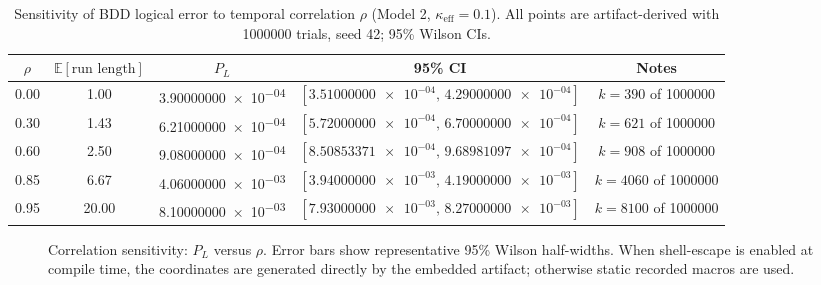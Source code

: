 \documentclass{article}
\newcommand{\simtrials}{1000000}
\newcommand{\simseed}{42}
\newcommand{\simrhoB}{0.60}
\newcommand{\simpLB}{9.08000000e-04}
\newcommand{\simpLBlo}{8.50853371e-04}
\newcommand{\simpLBhi}{9.68981097e-04}
\newcommand{\simkB}{908}
\newcommand{\simrhoD}{0.00}
\newcommand{\simpLD}{3.90000000e-04}
\newcommand{\simpLDlo}{3.51000000e-04}
\newcommand{\simpLDhi}{4.29000000e-04}
\newcommand{\simkD}{390}
\newcommand{\simrhoA}{0.30}
\newcommand{\simpLA}{6.21000000e-04}
\newcommand{\simpLAlo}{5.72000000e-04}
\newcommand{\simpLAhi}{6.70000000e-04}
\newcommand{\simkA}{621}
\newcommand{\simrhoC}{0.85}
\newcommand{\simpLC}{4.06000000e-03}
\newcommand{\simpLClo}{3.94000000e-03}
\newcommand{\simpLChi}{4.19000000e-03}
\newcommand{\simkC}{4060}
\newcommand{\simrhoE}{0.95}
\newcommand{\simpLE}{8.10000000e-03}
\newcommand{\simpLElo}{7.93000000e-03}
\newcommand{\simpLEhi}{8.27000000e-03}
\newcommand{\simkE}{8100}
\newcommand{\eLDhi}{3.90000000e-05}
\newcommand{\eLAhi}{4.90000000e-05}
\newcommand{\eLBhi}{6.10000000e-05}
\newcommand{\eLChi}{1.30000000e-04}
\newcommand{\eLEhi}{1.70000000e-04}
\newcommand{\rhoPlotCoords}{
  (\simrhoD,\simpLD) +- (0,\eLDhi)
  (\simrhoA,\simpLA) +- (0,\eLAhi)
  (\simrhoB,\simpLB) +- (0,\eLBhi)
  (\simrhoC,\simpLC) +- (0,\eLChi)
  (\simrhoE,\simpLE) +- (0,\eLEhi)
}
\newif\ifartifactplots
\newcommand{\RhoPlotAdd}{%
  \ifartifactplots
    \addplot+[only marks,mark=o,mark size=2pt, error bars/.cd, y dir=both, y explicit]
  \else
    \addplot+[only marks,mark=o,mark size=2pt, error bars/.cd, y dir=both, y explicit]
      coordinates {
        \rhoPlotCoords
      };
  \fi
}
\begin{document}
\begin{table}[ht]
\small
\centering
\caption{Sensitivity of BDD logical error to temporal correlation \(\rho\) (Model 2, \(\kappa_{\mathrm{eff}}=0.1\)). All points are artifact-derived with \simtrials{} trials, seed \simseed; 95\% Wilson CIs.}
\label{tab:sensitivity}
\begin{adjustbox}{width=\linewidth}
\begin{tabular}{ccccc}
\toprule
\(\rho\) & \(\mathbb{E}[\text{run length}]\) & \(P_L\) & 95\% CI & Notes \\
\midrule
\simrhoD & 1.00 & \num{\simpLD} & \([\num{\simpLDlo},\,\num{\simpLDhi}]\) & \(k=\simkD\) of \simtrials \\
\simrhoA & 1.43 & \num{\simpLA} & \([\num{\simpLAlo},\,\num{\simpLAhi}]\) & \(k=\simkA\) of \simtrials \\
\simrhoB & 2.50 & \num{\simpLB} & \([\num{\simpLBlo},\,\num{\simpLBhi}]\) & \(k=\simkB\) of \simtrials \\
\simrhoC & 6.67 & \num{\simpLC} & \([\num{\simpLClo},\,\num{\simpLChi}]\) & \(k=\simkC\) of \simtrials \\
\simrhoE & 20.00 & \num{\simpLE} & \([\num{\simpLElo},\,\num{\simpLEhi}]\) & \(k=\simkE\) of \simtrials \\
\bottomrule
\end{tabular}
\end{adjustbox}

\end{table}

\begin{figure}[ht]
\centering
\begin{adjustbox}{max width=\linewidth}
\end{adjustbox}
\caption{Correlation sensitivity: \(P_L\) versus \(\rho\). Error bars show representative 95\% Wilson half-widths. When shell-escape is enabled at compile time, the coordinates are generated directly by the embedded artifact; otherwise static recorded macros are used.}
\label{fig:plrho}

\end{figure}
\end{document}
